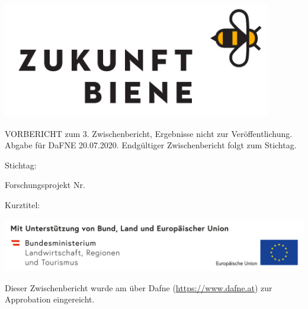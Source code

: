 \begin{titlepage}

\begin{center}

\includegraphics[height=50mm]{figures/logos/zukunft_biene_logo_rechteck}

\vfill\vfill\vfill
\vfill\vfill\vfill

{\large VORBERICHT zum 3. Zwischenbericht, Ergebnisse nicht zur Veröffentlichung. Abgabe für DaFNE 20.07.2020. Endgültiger Zwischenbericht folgt zum Stichtag.}

\vfill
Stichtag: \mydeadlinedate

\vfill\vfill\vfill

Forschungsprojekt Nr. \myprojectnumber

\vfill\vfill\vfill
\vfill\vfill\vfill

{\LARGE\textbf{\mytitle}\par}

\vfill
Kurztitel: {\bfseries\large\mysubtitle}

\vfill\vfill\vfill

\vspace*{\fill}
\includegraphics[width=\textwidth]{figures/logos/5_Foeg_Leiste_Bund+Land+EU_2020_RGB_leer}

\newpage

\vspace*{\fill}

Dieser Zwischenbericht wurde am {\mysubmissiondate} über Dafne (\url{https://www.dafne.at}) zur Approbation eingereicht. 

\end{center}
\end{titlepage}
